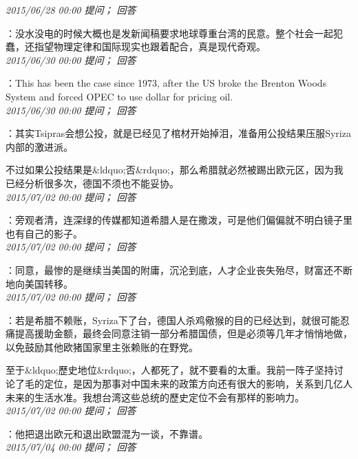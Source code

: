 \documentclass[twocolumn]{ctexart}
\begin{document}
\textit{\hfill\noindent\small 2015/06/28 00:00 提问； 回答}

：没水没电的时候大概也是发新闻稿要求地球尊重台湾的民意。整个社会一起犯蠢，还指望物理定律和国际现实也跟着配合，真是现代奇观。\\

\textit{\hfill\noindent\small 2015/06/30 00:00 提问； 回答}

：This has been the case since 1973, after the US broke the Brenton Woods System and forced OPEC to use dollar for pricing oil.\\

\textit{\hfill\noindent\small 2015/06/30 00:00 提问； 回答}

：其实Tsipras会想公投，就是已经见了棺材开始掉泪，准备用公投结果压服Syriza内部的激进派。

不过如果公投结果是\&ldquo;否\&rdquo;，那么希腊就必然被踢出欧元区，因为我已经分析很多次，德国不须也不能妥协。\\

\textit{\hfill\noindent\small 2015/07/02 00:00 提问； 回答}

：旁观者清，连深绿的传媒都知道希腊人是在撒泼，可是他们偏偏就不明白镜子里也有自己的影子。\\

\textit{\hfill\noindent\small 2015/07/02 00:00 提问； 回答}

：同意，最惨的是继续当美国的附庸，沉沦到底，人才企业丧失殆尽，财富还不断地向美国转移。\\

\textit{\hfill\noindent\small 2015/07/02 00:00 提问； 回答}

：若是希腊不赖账，Syriza下了台，德国人杀鸡儆猴的目的已经达到，就很可能忍痛提高援助金额，最终会同意注销一部分希腊国债，但是必须等几年才悄悄地做，以免鼓励其他欧猪国家里主张赖账的在野党。

至于\&ldquo;歷史地位\&rdquo;，人都死了，就不要看的太重。我前一阵子坚持讨论了毛的定位，是因为那事对中国未来的政策方向还有很大的影响，关系到几亿人未来的生活水准。我想台湾这些总统的歷史定位不会有那样的影响力。\\

\textit{\hfill\noindent\small 2015/07/02 00:00 提问； 回答}

：他把退出欧元和退出欧盟混为一谈，不靠谱。\\

\textit{\hfill\noindent\small 2015/07/04 00:00 提问； 回答}
\end{document}
